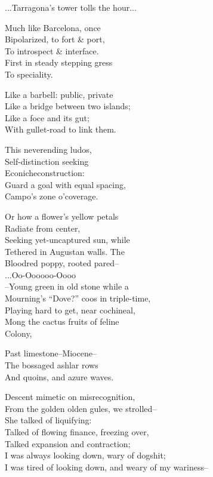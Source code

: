 ...Tarragona's tower tolls the hour... 

Much like Barcelona, once \\
Bipolarized, to fort \& port, \\
To introspect \& interface. \\
First in steady stepping gress \\
To speciality.

Like a barbell: public, private \\
Like a bridge between two islands; \\
Like a foce and its gut; \\
With gullet-road to link them. 

This neverending ludos, \\
Self-distinction seeking \\
Econicheconstruction: \\
Guard a goal with equal spacing, \\
Campo's zone o'coverage.

Or how a flower's yellow petals \\
Radiate from center, \\
Seeking yet-uncaptured sun, while \\
Tethered in Augustan walls. The \\
Bloodred poppy, rooted pared-- \\

\qquad ...Oo-Oooooo-Oooo \\

--Young green in old stone while a \\
Mourning's ``Dove?'' coos in triple-time, \\
Playing hard to get, near cochineal, \\
Mong the cactus fruits of feline \\
Colony,

Past limestone--Miocene-- \\
The bossaged ashlar rows \\
And quoins, and azure waves.

Descent mimetic on misrecognition, \\
From the golden olden gules, we strolled-- \\
She talked of liquifying: \\
Talked of flowing finance, freezing over, \\
Talked expansion and contraction; \\
I was always looking down, wary of dogshit; \\
I was tired of looking down, and weary of my wariness--

